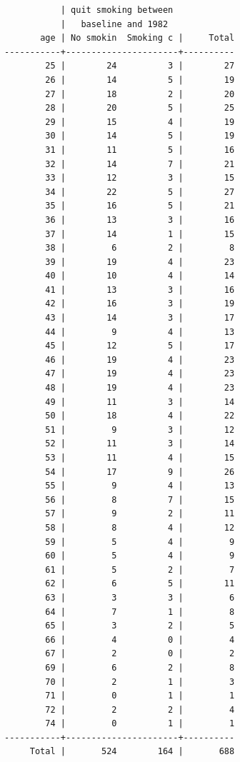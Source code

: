\documentclass[
  10pt,
  a4paper,
]{book}
\begin{document}
\begin{verbatim}
           | quit smoking between
           |   baseline and 1982
       age | No smokin  Smoking c |     Total
-----------+----------------------+----------
        25 |        24          3 |        27 
        26 |        14          5 |        19 
        27 |        18          2 |        20 
        28 |        20          5 |        25 
        29 |        15          4 |        19 
        30 |        14          5 |        19 
        31 |        11          5 |        16 
        32 |        14          7 |        21 
        33 |        12          3 |        15 
        34 |        22          5 |        27 
        35 |        16          5 |        21 
        36 |        13          3 |        16 
        37 |        14          1 |        15 
        38 |         6          2 |         8 
        39 |        19          4 |        23 
        40 |        10          4 |        14 
        41 |        13          3 |        16 
        42 |        16          3 |        19 
        43 |        14          3 |        17 
        44 |         9          4 |        13 
        45 |        12          5 |        17 
        46 |        19          4 |        23 
        47 |        19          4 |        23 
        48 |        19          4 |        23 
        49 |        11          3 |        14 
        50 |        18          4 |        22 
        51 |         9          3 |        12 
        52 |        11          3 |        14 
        53 |        11          4 |        15 
        54 |        17          9 |        26 
        55 |         9          4 |        13 
        56 |         8          7 |        15 
        57 |         9          2 |        11 
        58 |         8          4 |        12 
        59 |         5          4 |         9 
        60 |         5          4 |         9 
        61 |         5          2 |         7 
        62 |         6          5 |        11 
        63 |         3          3 |         6 
        64 |         7          1 |         8 
        65 |         3          2 |         5 
        66 |         4          0 |         4 
        67 |         2          0 |         2 
        69 |         6          2 |         8 
        70 |         2          1 |         3 
        71 |         0          1 |         1 
        72 |         2          2 |         4 
        74 |         0          1 |         1 
-----------+----------------------+----------
     Total |       524        164 |       688 


\end{verbatim}
\end{document}
